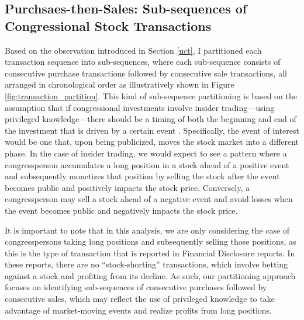 \documentclass[15pt,letterpaper]{article}
\begin{document}
\subsection{Purchsaes-then-Sales: Sub-sequences of Congressional Stock Transactions} \label{subsq}

Based on the observation introduced in Section \ref{uct}, I partitioned each transaction sequence into sub-sequences, where each sub-sequence consists of consecutive purchase transactions followed by consecutive sale transactions, all arranged in chronological order as illustratively shown in Figure \ref{fig:transaction_partition}. 
This kind of sub-sequence partitioning is based on the assumption that if congressional investments involve insider trading—using privileged knowledge—there should be a timing of both the beginning and end of the investment that is driven by a certain event \citep{event1, event2}. Specifically, the event of interest would be one that, upon being publicized, moves the stock market into a different phase. In the case of insider trading, we would expect to see a pattern where a congressperson accumulates a long position in a stock ahead of a positive event and subsequently monetizes that position by selling the stock after the event becomes public and positively impacts the stock price. Conversely, a congressperson may sell a stock ahead of a negative event and avoid losses when the event becomes public and negatively impacts the stock price.

It is important to note that in this analysis, we are only considering the case of congresspersons taking long positions and subsequently selling those positions, as this is the type of transaction that is reported in Financial Disclosure reports. In these reports, there are no ``stock-shorting'' transactions, which involve betting against a stock and profiting from its decline. As such, our partitioning approach focuses on identifying sub-sequences of consecutive purchases followed by consecutive sales, which may reflect the use of privileged knowledge to take advantage of market-moving events and realize profits from long positions.
\end{document}
